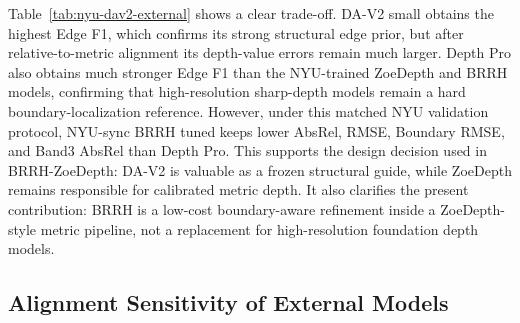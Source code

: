 \documentclass{ieeeaccess}
\begin{document}
Table~\ref{tab:nyu-dav2-external} shows a clear trade-off. DA-V2 small obtains the highest Edge F1, which confirms its strong structural edge prior, but after relative-to-metric alignment its depth-value errors remain much larger. Depth Pro also obtains much stronger Edge F1 than the NYU-trained ZoeDepth and BRRH models, confirming that high-resolution sharp-depth models remain a hard boundary-localization reference. However, under this matched NYU validation protocol, NYU-sync BRRH tuned keeps lower AbsRel, RMSE, Boundary RMSE, and Band3 AbsRel than Depth Pro. This supports the design decision used in BRRH-ZoeDepth: DA-V2 is valuable as a frozen structural guide, while ZoeDepth remains responsible for calibrated metric depth. It also clarifies the present contribution: BRRH is a low-cost boundary-aware refinement inside a ZoeDepth-style metric pipeline, not a replacement for high-resolution foundation depth models.

\begin{table}[t]
\centering
\small
\caption{External baselines on NYU Depth V2 labeled val654. DA-V2 is evaluated as a relative-depth model with inverse output and median alignment; Depth Pro is evaluated with its official checkpoint under the same validation protocol.}
\label{tab:nyu-dav2-external}
\end{table}

\subsection{Alignment Sensitivity of External Models}
\end{document}
